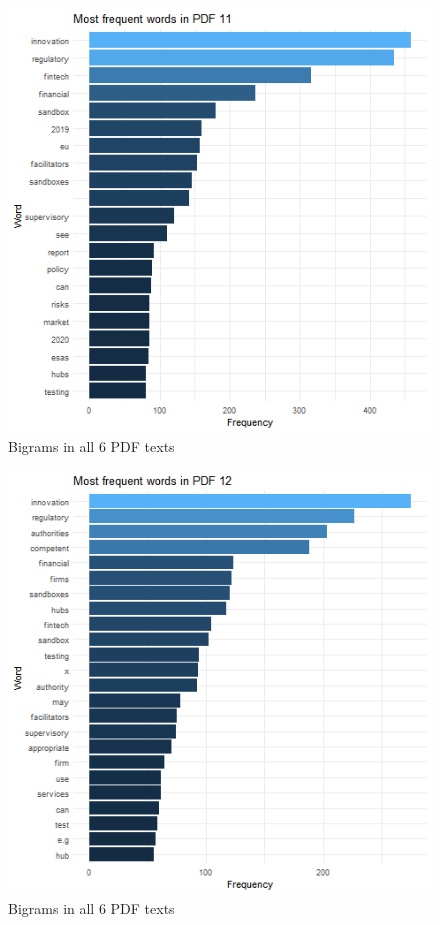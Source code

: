 \documentclass[
]{book}
\begin{document}
\begin{figure}

{\centering \includegraphics[width=0.8\linewidth]{img/freqP11} 

}

\caption{Bigrams in all 6 PDF texts}\label{fig:nice-figF7-16-5}
\end{figure}
\begin{figure}

{\centering \includegraphics[width=0.8\linewidth]{img/freqP12} 

}

\caption{Bigrams in all 6 PDF texts}\label{fig:nice-figF7-16-6}
\end{figure}
\end{document}
